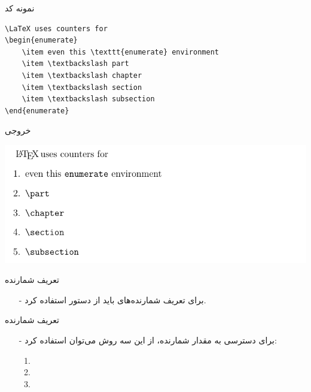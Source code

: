 \begin{frame}[fragile]{نمونه کد}
\begin{latin}
\begin{lstlisting}[keywords={begin, end}, keywordstyle=\color{Mulberry}\textbf]
\LaTeX uses counters for
\begin{enumerate}
    \item even this \texttt{enumerate} environment
    \item \textbackslash part
    \item \textbackslash chapter
    \item \textbackslash section
    \item \textbackslash subsection
\end{enumerate}
\end{lstlisting}
\end{latin}
\end{frame}

\begin{frame}{خروجی}
\begin{center}
\includegraphics[width=\textwidth]{docs/images/enum-2}
\end{center}
\end{frame}


\begin{frame}{تعریف شمارنده}
\begin{itemize}\itemr
\item[-]
برای تعریف شمارنده‌های باید از دستور
استفاده کرد.
\end{itemize}
\end{frame}

\begin{frame}{تعریف شمارنده}
\begin{itemize}\itemr
\item[-]
برای دسترسی به مقدار شمارنده، از این سه روش می‌توان استفاده کرد:

\begin{enumerate}\itemr
\item 
{}

\item 
{}

\item
{}
\end{enumerate}
\end{itemize}
\end{frame}

